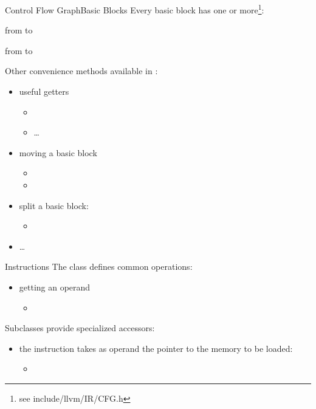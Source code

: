 \begin{frame}{Control Flow Graph}{Basic Blocks}
Every basic block  has one or more\footnote{see include/llvm/IR/CFG.h}:

\begin{description}[predecessors]
\item[predecessors] from  to
\item[successors] from  to
\end{description}

\vfill
Other convenience methods available in :

\begin{itemize}
\item useful getters
\begin{itemize}
\item {}
\item \ldots
\end{itemize}
\item moving a basic block
\begin{itemize}
\item      {}
\item      {}
\end{itemize}
\item split a basic block:
\begin{itemize}
\item      {}
\end{itemize}
\item \ldots
\end{itemize}
\end{frame}


\begin{frame}{Instructions}
The  class defines common operations: \\
\medskip
\begin{itemize}
\item getting an operand
\begin{itemize}
\item {}
\end{itemize}
\end{itemize}
\vfill
Subclasses provide specialized accessors: \\
\medskip
\begin{itemize}
\item the  instruction takes as operand the pointer to the memory to be loaded:
\begin{itemize}
\item      {}
\end{itemize}
\end{itemize}
\end{frame}


